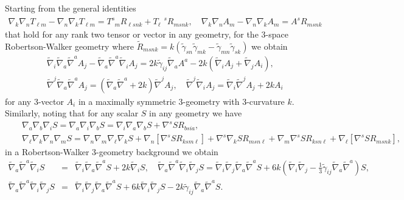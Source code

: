 \documentclass[aps,onecolumn,10pt]{revtex4}
\numberwithin{equation}{section}
\numberwithin{equation}{section}
\begin{document}
Starting from the general identities
%
\begin{eqnarray}
\nabla_{k}\nabla_{n}T_{\ell m}-\nabla_{n}\nabla_{k}T_{\ell m}=T^{s}_{\phantom{s}m}R_{\ell s n k}+T_{\ell}^{\phantom{\ell}s}R_{ms n k},\quad
\nabla_{k}\nabla_{n}A_{m}-\nabla_{n}\nabla_{k}A_{m}=A^{s}R_{ms n k}
\label{9.18}
\end{eqnarray}
%
that hold for any rank two tensor or vector in any geometry, for the 3-space Robertson-Walker geometry where $\tilde{R}_{msnk}=k(\tilde{\gamma}_{sn}\tilde{\gamma}_{mk}-\tilde{\gamma}_{mn}\tilde{\gamma}_{sk})$ 
we obtain
%
\begin{eqnarray}
&&\tilde\nabla_i\tilde\nabla_a\tilde\nabla^aA_j-\tilde\nabla_a\tilde\nabla^a\tilde\nabla_iA_j 
= 2k\tilde{\gamma}_{ij}\tilde{\nabla}_aA^a-2k(\tilde\nabla_i A_j + \tilde\nabla_j A_i),
\nonumber\\
&&\tilde\nabla^j\tilde\nabla_a\tilde\nabla^aA_j=
(\tilde\nabla_a\tilde\nabla^a+2k)\tilde\nabla^j A_j,\quad \tilde{\nabla}^j\tilde{\nabla}_iA_j=\tilde{\nabla}_i\tilde{\nabla}^jA_j+2kA_i
\label{9.19}
\end{eqnarray}
%
for any 3-vector $A_i$ in a maximally symmetric 3-geometry with 3-curvature $k$. Similarly, noting that for any scalar $S$ in any geometry we have
%
\begin{eqnarray}
&&\nabla_a\nabla_b\nabla_iS=\nabla_a\nabla_i\nabla_bS=\nabla_i\nabla_a\nabla_bS+\nabla^sSR_{bsia},
\nonumber\\
&&\nabla_{\ell}\nabla_k\nabla_n\nabla_{m}S=\nabla_n\nabla_{m}\nabla_{\ell}\nabla_kS
+\nabla_{n}[\nabla^sSR_{ksm\ell}]
+\nabla^s\nabla_kSR_{msn\ell}
+\nabla_m\nabla^sSR_{ksn\ell}
+\nabla_{\ell}[\nabla^sSR_{msnk}],
\label{9.20}
\end{eqnarray}
%
in a Robertson-Walker 3-geometry background we obtain 
%
\begin{eqnarray}
\tilde{\nabla}_a\tilde{\nabla}^a\tilde{\nabla}_iS&=&\tilde{\nabla}_i\tilde{\nabla}_a\tilde{\nabla}^aS+2k\tilde{\nabla}_iS,\quad \tilde{\nabla}_a\tilde{\nabla}^a\tilde{\nabla}_i\tilde{\nabla}_jS=\tilde{\nabla}_i\tilde{\nabla}_j\tilde{\nabla}_a\tilde{\nabla}^aS+6k(\tilde{\nabla}_i\tilde{\nabla}_j-\tfrac{1}{3}\tilde{\gamma}_{ij}\tilde{\nabla}_a\tilde{\nabla}^a)S,
\nonumber\\
\tilde{\nabla}_a\tilde{\nabla}^a\tilde{\nabla}_i\tilde{\nabla}_{j}S&=&\tilde{\nabla}_i\tilde{\nabla}_{j}\tilde{\nabla}_a\tilde{\nabla}^aS
+6k\tilde{\nabla}_i\tilde{\nabla}_{j}S-2k\tilde{\gamma}_{ij}\tilde{\nabla}_a\tilde{\nabla}^aS.
\label{9.21}
\end{eqnarray}
\end{document}
